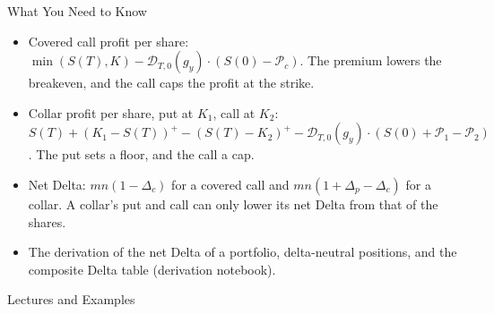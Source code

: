 \documentclass[aspectratio=169,11pt]{beamer}
\newcommand{\Dc}{\mathcal{D}}
\newcommand{\Pc}{\mathcal{P}}
\newcommand{\repo}{https://github.com/varnerlab/CHEME-5660-CourseRepository-Fall-2026/blob/main/lectures/week-11/L11b}
\begin{document}
\begin{frame}{What You Need to Know}
  \vspace{0.3em}
  {\large\textbf{}}
  \begin{itemize}\setlength{\itemsep}{0.4em}
    \item Covered call profit per share:
      $\min(S(T),K)-\Dc_{T,0}(g_{y})\cdot(S(0)-\Pc_{c})$. The premium lowers the
      breakeven, and the call caps the profit at the strike.
    \item Collar profit per share, put at $K_{1}$, call at $K_{2}$:
      $S(T)+(K_{1}-S(T))^{+}-(S(T)-K_{2})^{+}-\Dc_{T,0}(g_{y})\cdot(S(0)+\Pc_{1}-\Pc_{2})$.
      The put sets a floor, and the call a cap.
    \item Net Delta: $mn(1-\Delta_{c})$ for a covered call and
      $mn(1+\Delta_{p}-\Delta_{c})$ for a collar. A collar's put and call can only
      lower its net Delta from that of the shares.
  \end{itemize}

  \vspace{0.5em}
  {\large\textbf{} }
  \begin{itemize}\setlength{\itemsep}{0.3em}
    \item The derivation of the net Delta of a portfolio, delta-neutral
      positions, and the composite Delta table (derivation notebook).
  \end{itemize}
\end{frame}

\begin{frame}{Lectures and Examples}
  \vspace{0.3em}
  {\normalsize\textbf{}\par\small
  \href{\repo/CHEME-5660-L11b-Lecture-CoveredCalls-Collars-Fall-2026.ipynb}{}}

  \vspace{0.6em}
  {\normalsize\textbf{}\par\small
  \href{\repo/CHEME-5660-L11b-Example-AnalysisCoveredCall-Fall-2026.ipynb}{}\par
  \href{\repo/CHEME-5660-L11b-Example-StandardListed-SPY-ProtectiveCollar-Fall-2026.ipynb}{}}

  \vspace{0.45em}
  {\normalsize\textbf{}\par\small
  \href{\repo/CHEME-5660-L11b-Example-CoveredCallFund-SPY-Fall-2026.ipynb}{}\par
  \href{\repo/CHEME-5660-L11b-Derivation-NetDelta-Fall-2026.ipynb}{}}
\end{frame}
\end{document}
